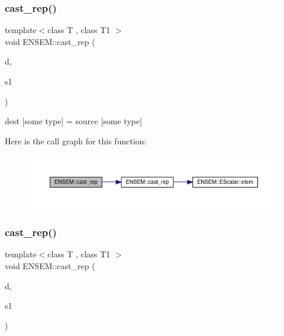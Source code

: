 \subsubsection{\texorpdfstring{cast\_rep()}{cast\_rep()}\hspace{0.1cm}{\footnotesize\ttfamily [1/2]}}
{\footnotesize\ttfamily template$<$class T , class T1 $>$ \\
void E\+N\+S\+E\+M\+::cast\+\_\+rep (\begin{DoxyParamCaption}\item[{T \&}]{d,  }\item[{const \mbox{\hyperlink{classENSEM_1_1PScalar}{P\+Scalar}}$<$ T1 $>$ \&}]{s1 }\end{DoxyParamCaption})\hspace{0.3cm}{\ttfamily [inline]}}



dest \mbox{[}some type\mbox{]} = source \mbox{[}some type\mbox{]} 

Here is the call graph for this function\+:\nopagebreak
\begin{figure}[H]
\begin{center}
\leavevmode
\includegraphics[width=350pt]{db/dcc/group__primscalar_ga32486e123809d21bcf028ab891ee845a_cgraph}
\end{center}
\end{figure}
\mbox{\label{group__primscalar_ga1444be24a3863d0af7a71b450500cb9d}} 
\subsubsection{\texorpdfstring{cast\_rep()}{cast\_rep()}\hspace{0.1cm}{\footnotesize\ttfamily [2/2]}}
{\footnotesize\ttfamily template$<$class T , class T1 $>$ \\
void E\+N\+S\+E\+M\+::cast\+\_\+rep (\begin{DoxyParamCaption}\item[{\mbox{\hyperlink{classENSEM_1_1PScalar}{P\+Scalar}}$<$ T $>$ \&}]{d,  }\item[{const \mbox{\hyperlink{classENSEM_1_1PScalar}{P\+Scalar}}$<$ T1 $>$ \&}]{s1 }\end{DoxyParamCaption})\hspace{0.3cm}{\ttfamily [inline]}}



